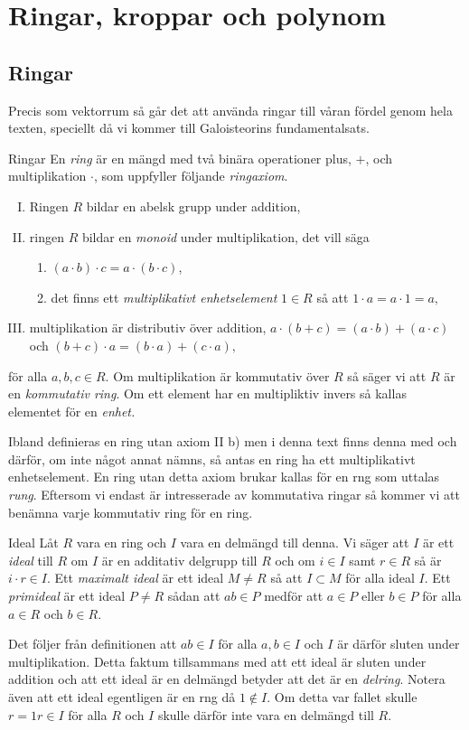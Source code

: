 \documentclass{article}
\theoremstyle{definition}
\begin{document}
\section{Ringar, kroppar och polynom}
\subsection{Ringar}
Precis som vektorrum så går det att använda ringar till våran fördel genom hela texten, speciellt då vi kommer till
Galoisteorins fundamentalsats.
\begin{mydef}{Ringar}{}
  En \textit{ring} är en mängd med två binära operationer plus, $+$, och multiplikation $\cdot$, som uppfyller följande \textit{ringaxiom}.
  \begin{enumerate}[I)]
    \item Ringen $R$ bildar en abelsk grupp under addition,
    \item ringen $R$ bildar en \textit{monoid} under multiplikation, det vill säga 
    \begin{enumerate}
      \item $(a \cdot b) \cdot c = a \cdot (b \cdot c)$,
      \item det finns ett \textit{multiplikativt enhetselement} $1 \in R$ så att $1 \cdot a = a \cdot 1 = a,$
    \end{enumerate}
    \item multiplikation är distributiv över addition, $a \cdot (b+c) = (a \cdot b) + (a \cdot c)$ och $(b + c) \cdot a = (b \cdot a) + (c \cdot a),$
  \end{enumerate}
  för alla $a, b, c \in R$. Om multiplikation är kommutativ över $R$ så säger vi att $R$ är en \textit{kommutativ ring}. 
  Om ett element har en multipliktiv invers så kallas elementet för en \textit{enhet.}
\end{mydef}
Ibland definieras en ring utan axiom II b) men i denna text finns denna med och därför, om inte något annat nämns, så antas en ring ha ett multiplikativt enhetselement. 
En ring utan detta axiom brukar kallas för en rng som uttalas \textit{rung}. Eftersom vi endast är intresserade av kommutativa ringar så kommer vi 
att benämna varje kommutativ ring för en ring. 

\begin{mydef}{Ideal}{}
  Låt $R$ vara en ring och $I$ vara en delmängd till denna. Vi säger att $I$ är ett \textit{ideal} till $R$ om $I$ är en additativ delgrupp till $R$
  och om $i \in I$ samt $r \in R$ så är $i \cdot r \in I$. Ett \textit{maximalt ideal} är ett ideal $M \neq R$ så att $I \subset M$ för alla 
  ideal $I$. Ett \textit{primideal} är ett ideal $P \neq R$ sådan att $ab \in P$ medför att $a \in P$ eller $b \in P$ för alla $a \in R$ och $b \in R$.
\end{mydef}
Det följer från definitionen att $ab \in I$ för alla $a, b \in I$ och $I$ är därför sluten under multiplikation. Detta faktum tillsammans 
med att ett ideal är sluten under addition och att ett ideal är en delmängd betyder att det är en \textit{delring}.
Notera även att ett ideal egentligen är en rng då $1 \notin I$. Om detta var fallet skulle 
$r = 1r \in I$ för alla $R$ och $I$ skulle därför inte vara en delmängd till $R$. 
\end{document}
